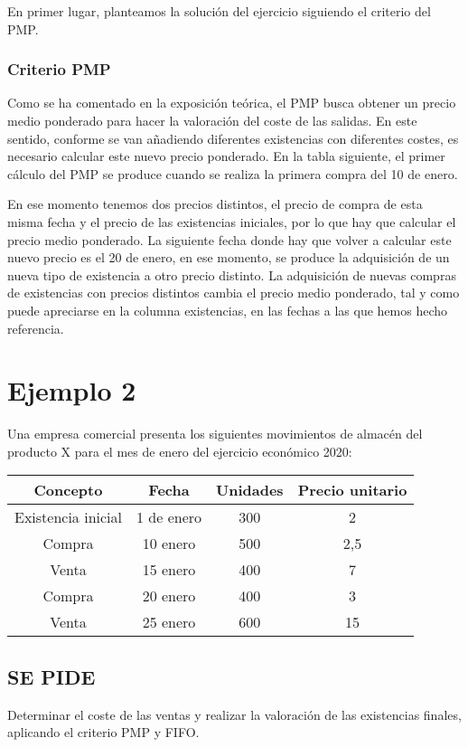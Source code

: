 \documentclass{article}
\begin{document}
En primer lugar, planteamos la solución del ejercicio siguiendo el criterio del PMP.

\subsubsection*{Criterio PMP}

Como se ha comentado en la exposición teórica, el PMP busca obtener un precio medio ponderado para hacer la valoración del coste de las salidas. En este sentido, conforme se van añadiendo diferentes existencias con diferentes costes, es necesario calcular este nuevo precio ponderado. En la tabla siguiente, el primer cálculo del PMP se produce cuando se realiza la primera compra del 10 de enero.

En ese momento tenemos dos precios distintos, el precio de compra de esta misma fecha y el precio de las existencias iniciales, por lo que hay que calcular el precio medio ponderado. La siguiente fecha donde hay que volver a calcular este nuevo precio es el 20 de enero, en ese momento, se produce la adquisición de un nueva tipo de existencia a otro precio distinto. La adquisición de nuevas compras de existencias con precios distintos cambia el precio medio ponderado, tal y como puede apreciarse en la columna existencias, en las fechas a las que hemos hecho referencia.

\section*{Ejemplo 2}

Una empresa comercial presenta los siguientes movimientos de almacén del producto X para el mes de enero del ejercicio económico 2020:

\begin{tabular}{|c|c|c|c|}
\hline
\textbf{Concepto} & \textbf{Fecha} & \textbf{Unidades} & \textbf{Precio unitario} \\
\hline
Existencia inicial & 1 de enero & 300 & 2 \\
\hline
Compra & 10 enero & 500 & 2,5 \\
\hline
Venta & 15 enero & 400 & 7 \\
\hline
Compra & 20 enero & 400 & 3 \\
\hline
Venta & 25 enero & 600 & 15 \\
\hline
\end{tabular}

\subsection*{SE PIDE}
Determinar el coste de las ventas y realizar la valoración de las existencias finales, aplicando el criterio PMP y FIFO.
\end{document}
